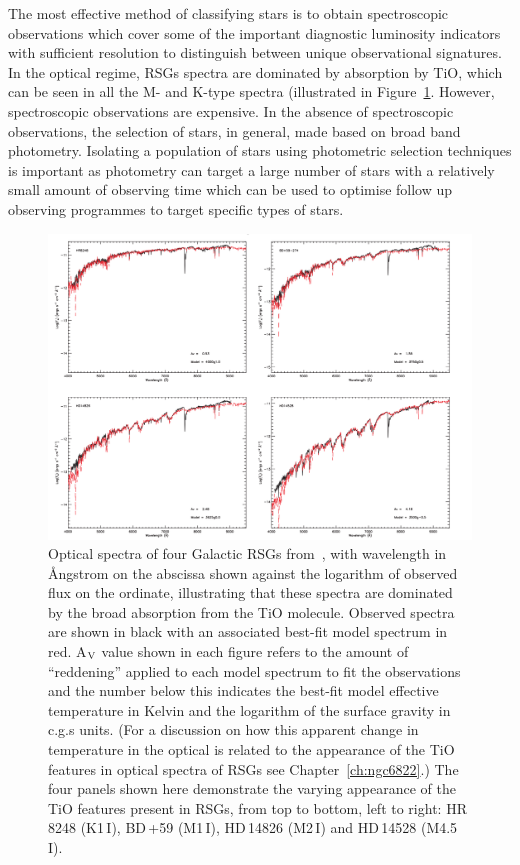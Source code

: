 The most effective method of classifying stars is to obtain spectroscopic observations which cover some of the important diagnostic luminosity indicators with sufficient resolution to distinguish between unique observational signatures.
In the optical regime, RSGs spectra are dominated by absorption by TiO, which can be seen in all the M- and K-type spectra (illustrated in Figure~\ref{fig:RSGoptical}.
However, spectroscopic observations are expensive.
In the absence of spectroscopic observations, the selection of stars, in general, made based on broad band photometry.
Isolating a population of stars using photometric selection techniques is important as photometry can target a large number of stars with a relatively small amount of observing time which can be used to optimise follow up observing programmes to target specific types of stars.

 \begin{figure}
 \centering
 \includegraphics[width=\textwidth]{intro/Levesque_Fig1}
 \caption[Optical spectra of four RSGs from~\cite{Levesque05}]{Optical spectra of four Galactic RSGs from~\cite{Levesque05}, with wavelength in \AA ngstrom on the abscissa shown against the logarithm of observed flux on the ordinate, illustrating that these spectra are dominated by the broad absorption from the TiO molecule.
 Observed spectra are shown in black with an associated best-fit model spectrum in red.
 A$_{\rm V}$ value shown in each figure refers to the amount of ``reddening'' applied to each model spectrum to fit the observations and the number below this indicates the best-fit model effective temperature in Kelvin and the logarithm of the surface gravity in c.g.s units. (For a discussion on how this apparent change in temperature in the optical is related to the appearance of the TiO features in optical spectra of RSGs see Chapter~\ref{ch:ngc6822}.)
 The four panels shown here demonstrate the varying appearance of the TiO features present in RSGs, from top to bottom, left to right:
 HR\,8248 (K1\,I),
 BD\,+59 (M1\,I),
 HD\,14826 (M2\,I) and
 HD\,14528 (M4.5\,I).
 \label{fig:RSGoptical}}
\end{figure}

